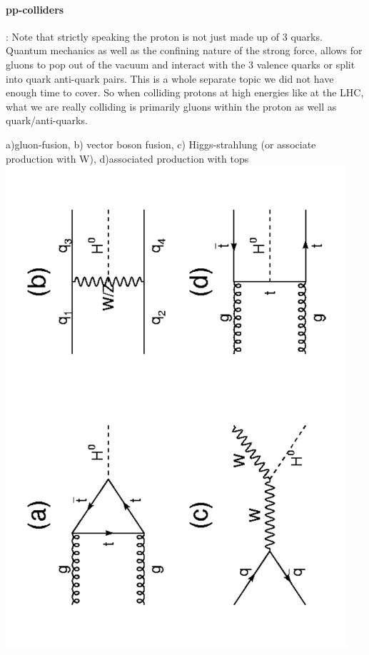 \paragraph{pp-colliders}:
Note that strictly speaking the proton is not just made up of 3 quarks. Quantum mechanics as well as the confining nature of the strong force, allows for gluons to pop out of the vacuum and interact with the 3 valence quarks or split into quark anti-quark pairs. This is a whole separate topic we did not have enough time to cover.
So when colliding protons at high energies like at the LHC, what we are really colliding is primarily gluons within the proton as well as quark/anti-quarks.
\begin{center}
a)gluon-fusion, b) vector boson fusion, c) Higgs-strahlung (or associate production with W), d)associated production with tops
\includegraphics[angle=270,width=0.95\textwidth]{fig/higgs/higgs_production_lhc.pdf}
\end{center}

